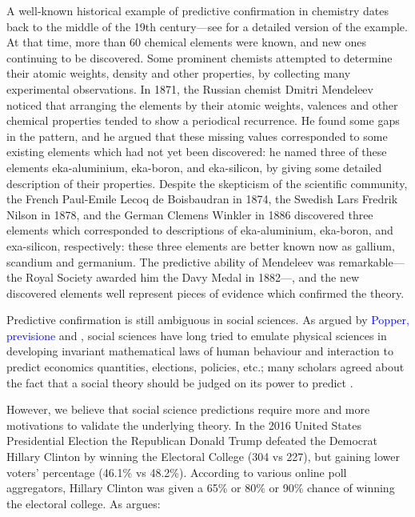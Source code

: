 \documentclass{statsoc}
\begin{document}
A well-known historical example of predictive confirmation in chemistry dates back to the middle of the 19th century---see \cite{maher1988prediction} for a detailed version of the 
example. At that time, more than 60 chemical elements were known, and new ones continuing to be discovered. Some prominent chemists attempted to determine their atomic weights, 
density and other properties, by collecting many experimental observations. In 1871, the Russian chemist Dmitri Mendeleev noticed that arranging the elements by their atomic 
weights, valences and other chemical properties tended to show a periodical recurrence. He found some gaps in the pattern, and he argued that these missing values corresponded to 
some existing elements which had not yet been discovered: he named three of these elements eka-aluminium, eka-boron, and eka-silicon, by giving some detailed description of their 
properties. Despite the skepticism of the scientific community, the French Paul-Emile Lecoq de Boisbaudran in 1874, the Swedish Lars Fredrik Nilson in 1878, and the German Clemens 
Winkler in 1886 discovered three elements which corresponded to descriptions of eka-aluminium, eka-boron, and exa-silicon, respectively: these three elements are better known 
now as gallium, scandium and germanium. The predictive ability of Mendeleev was remarkable---the Royal Society awarded him the Davy Medal in 1882---, and the new discovered elements well represent pieces of evidence which confirmed the theory.

Predictive confirmation is still ambiguous in social sciences. As argued by \textcolor{blue}{Popper, previsione} and \cite{sarewitz1999prediction}, social sciences 
have long tried to emulate physical sciences in developing invariant mathematical laws of human behaviour and interaction to predict economics quantities, elections, policies, etc.; 
many scholars agreed about the fact that a social theory should be judged on its power to predict \citep{friedman1953essays}. 

However, we believe that social science predictions require more and more motivations to validate the underlying theory. In the 2016 United States Presidential Election the Republican Donald Trump defeated the Democrat Hillary Clinton by winning the Electoral College (304 vs 227), but gaining lower voters' percentage (46.1\% vs 48.2\%). According to various online poll aggregators, Hillary Clinton was given a 65\% or 80\% or 90\% chance of winning the electoral college.  As \cite{gelman2016elections} argues:
\end{document}
